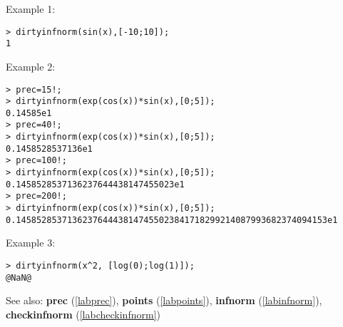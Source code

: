 \noindent Example 1: 
\begin{center}\begin{minipage}{15cm}\begin{Verbatim}[frame=single]
> dirtyinfnorm(sin(x),[-10;10]);
1
\end{Verbatim}
\end{minipage}\end{center}
\noindent Example 2: 
\begin{center}\begin{minipage}{15cm}\begin{Verbatim}[frame=single]
> prec=15!;
> dirtyinfnorm(exp(cos(x))*sin(x),[0;5]);
0.14585e1
> prec=40!;
> dirtyinfnorm(exp(cos(x))*sin(x),[0;5]);
0.1458528537136e1
> prec=100!;
> dirtyinfnorm(exp(cos(x))*sin(x),[0;5]);
0.1458528537136237644438147455023e1
> prec=200!;
> dirtyinfnorm(exp(cos(x))*sin(x),[0;5]);
0.1458528537136237644438147455023841718299214087993682374094153e1
\end{Verbatim}
\end{minipage}\end{center}
\noindent Example 3: 
\begin{center}\begin{minipage}{15cm}\begin{Verbatim}[frame=single]
> dirtyinfnorm(x^2, [log(0);log(1)]);
@NaN@
\end{Verbatim}
\end{minipage}\end{center}
See also: \textbf{prec} (\ref{labprec}), \textbf{points} (\ref{labpoints}), \textbf{infnorm} (\ref{labinfnorm}), \textbf{checkinfnorm} (\ref{labcheckinfnorm})
